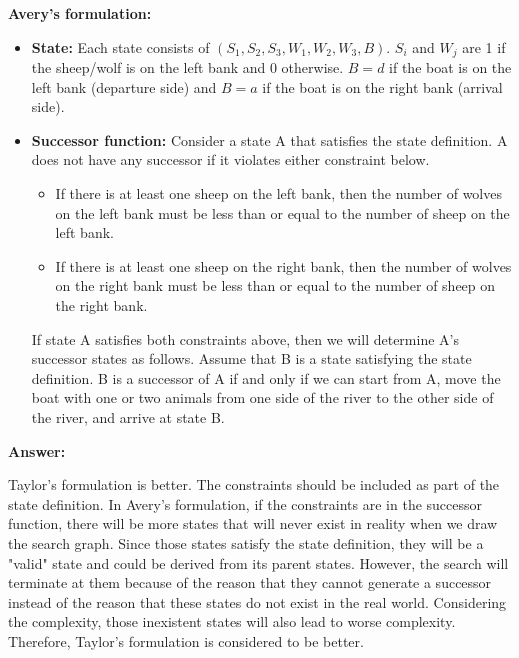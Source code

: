 \documentclass[12pt]{article}
\begin{document}
\begin{enumerate}[(a)]
\begin{example}
\begin{itemize}
\end{itemize}

\end{example}

\begin{example}
{\bf Avery's formulation:}

\begin{itemize}
\item
{\bf State:} Each state consists of $(S_1, S_2, S_3, W_1, W_2, W_3, B)$. $S_i$ and $W_j$ are 1 if the sheep/wolf is on the left bank and 0 otherwise. $B = d$ if the boat is on the left bank (departure side) and $B = a$ if the boat is on the right bank (arrival side). 

\item
{\bf Successor function:} Consider a state A that satisfies the state definition. 
A does not have any successor if it violates either constraint below.

\begin{itemize}
\item 
If there is at least one sheep on the left bank, then the number of wolves on the left bank must be less than or equal to the number of sheep on the left bank. 

\item
If there is at least one sheep on the right bank, then the number of wolves on the right bank must be less than or equal to the number of sheep on the right bank. 
\end{itemize}

If state A satisfies both constraints above, then we will determine A's successor states as follows. Assume that B is a state satisfying the state definition. B is a successor of A if and only if we can start from A, move the boat with one or two animals from one side of the river to the other side of the river, and arrive at state B.
\end{itemize}

\end{example}


{\bf Answer:}

Taylor's formulation is better. The constraints should be included as part of the state definition. In Avery's formulation, if the constraints are in the successor function, there will be more states that will never exist in reality when we draw the search graph. Since those states satisfy the state definition, they will be a "valid" state and could be derived from its parent states. However, the search will terminate at them because of the reason that they cannot generate a successor instead of the reason that these states do not exist in the real world. Considering the complexity, those inexistent states will also lead to worse complexity. Therefore, Taylor's formulation is considered to be better.




\end{enumerate}
\end{document}
